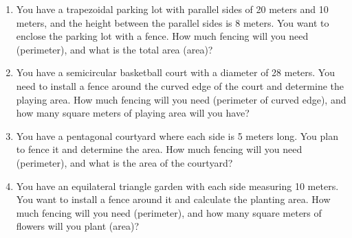 \begin{enumerate}[label=(\alph*)]
    \item You have a trapezoidal parking lot with parallel sides of 20 meters and 10 meters, and the height between the parallel sides is 8 meters. You want to enclose the parking lot with a fence. How much fencing will you need (perimeter), and what is the total area (area)?

    \pagebreak
    \item You have a semicircular basketball court with a diameter of 28 meters. You need to install a fence around the curved edge of the court and determine the playing area. How much fencing will you need (perimeter of curved edge), and how many square meters of playing area will you have?

    \pagebreak
    \item You have a pentagonal courtyard where each side is 5 meters long. You plan to fence it and determine the area. How much fencing will you need (perimeter), and what is the area of the courtyard?

    \pagebreak
    \item You have an equilateral triangle garden with each side measuring 10 meters. You want to install a fence around it and calculate the planting area. How much fencing will you need (perimeter), and how many square meters of flowers will you plant (area)?


\end{enumerate}
